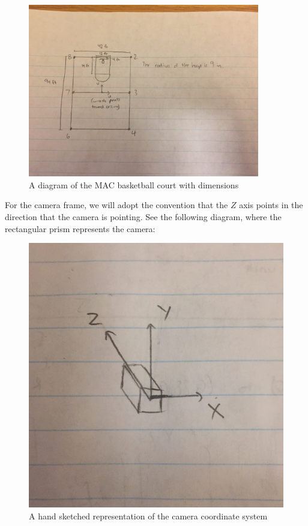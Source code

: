 \documentclass{article}
\begin{document}
\begin{figure}[H]
\centering
\includegraphics[width=0.90\textwidth]{Court_Diagram}
\caption*{A diagram of the MAC basketball court with dimensions}
\end{figure}

For the camera frame, we will adopt the convention that the $Z$ axis points in the direction that the camera is pointing. 
See the following diagram, where the rectangular prism represents the camera:

\begin{figure}[H]
\includegraphics[scale=0.1]{Camera_Coordinates}
\centering
\caption*{A hand sketched representation of the camera coordinate system}
\end{figure}
\end{document}
